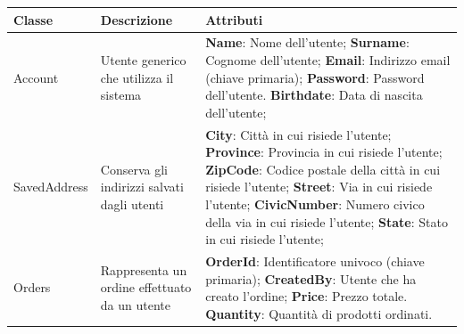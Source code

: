 \begin{tabularx}{\textwidth}{YYY}
  \toprule
  \textbf{Classe} & \textbf{Descrizione} & \textbf{Attributi} \\
  \midrule
  Account & Utente generico che utilizza il sistema &
  \begin{minipage}[c]{\linewidth}%
    \vspace{0.45cm}
    \footnotesize
    \textbf{Name}: Nome dell'utente; \newline
    \textbf{Surname}: Cognome dell'utente; \newline
    \textbf{Email}: Indirizzo email (chiave primaria); \newline
    \textbf{Password}: Password dell'utente. \newline
    \textbf{Birthdate}: Data di nascita dell'utente; \newline
  \end{minipage} \\
  SavedAddress & Conserva gli indirizzi salvati dagli utenti &
  \begin{minipage}[c]{\linewidth}%
    \vspace{0.45cm}
    \footnotesize
    \textbf{City}: Città in cui risiede l'utente; \newline
    \textbf{Province}: Provincia in cui risiede l'utente; \newline
    \textbf{ZipCode}: Codice postale della città in cui risiede l'utente; \newline
    \textbf{Street}: Via in cui risiede l'utente; \newline
    \textbf{CivicNumber}: Numero civico della via in cui risiede l'utente; \newline
    \textbf{State}: Stato in cui risiede l'utente; \newline
  \end{minipage} \\
  Orders & Rappresenta un ordine effettuato da un utente &
  \begin{minipage}[c]{\linewidth}%
    \vspace{0.45cm}
    \footnotesize
    \textbf{OrderId}: Identificatore univoco (chiave primaria); \newline
    \textbf{CreatedBy}: Utente che ha creato l'ordine; \newline
    \textbf{Price}: Prezzo totale. \newline
    \textbf{Quantity}: Quantità di prodotti ordinati. \newline

\end{minipage}
\end{tabularx}
